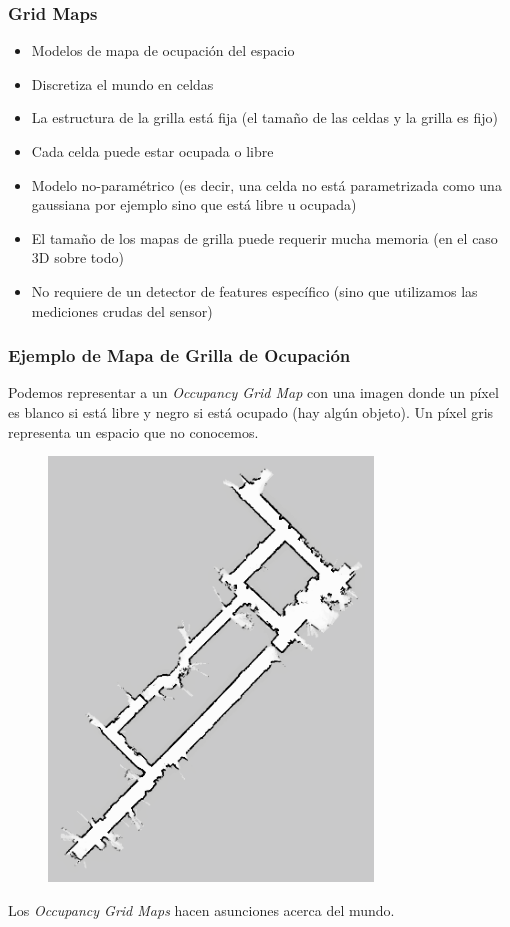 \begin{frame}
    \frametitle{Grid Maps}
    
    \note{}
    
    \begin{itemize}
        \item Modelos de mapa de ocupación del espacio
        \item Discretiza el mundo en celdas
        \item La estructura de la grilla está fija (el tamaño de las celdas y la grilla es fijo)
        \item Cada celda puede estar ocupada o libre
        \item Modelo no-paramétrico (es decir, una celda no está parametrizada como una gaussiana por ejemplo sino que está libre u ocupada)
        \item El tamaño de los mapas de grilla puede requerir mucha memoria (en el caso 3D sobre todo)
        \item No requiere de un detector de features específico (sino que utilizamos las mediciones crudas del sensor)
    \end{itemize}
\end{frame}

\begin{frame}
    \frametitle{Ejemplo de Mapa de Grilla de Ocupación}
    
    Podemos representar a un \emph{Occupancy Grid Map} con una imagen donde un píxel es blanco si está libre y negro si está ocupado (hay algún objeto). Un píxel gris representa un espacio que no conocemos.
    
  	\begin{figure}[!h]
    		\includegraphics[width=0.23\columnwidth]{./images/volumetric_map_2d.png}
    \end{figure}


	Los \emph{Occupancy Grid Maps} hacen asunciones acerca del mundo.
       
\end{frame}

